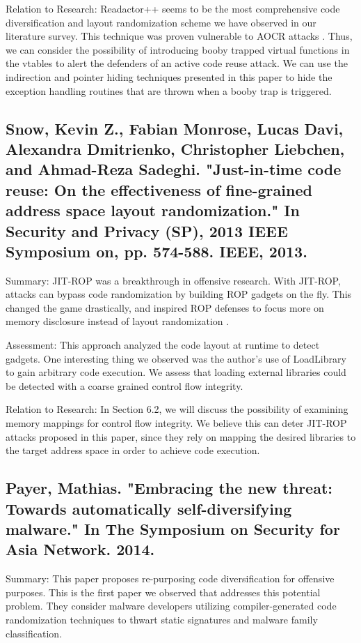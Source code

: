 \documentclass[preprint,12pt]{elsarticle}
\begin{document}
Relation to Research: Readactor++ seems to be the most comprehensive code diversification and layout randomization scheme we have observed in our literature survey. This technique was proven vulnerable to AOCR attacks \cite{rudd2017address}. Thus, we can consider the possibility of introducing booby trapped virtual functions in the vtables to alert the defenders of an active code reuse attack. We can use the indirection and pointer hiding techniques presented in this paper to hide the exception handling routines that are thrown when a booby trap is triggered.

\subsection{
\cite{snow2013just} Snow, Kevin Z., Fabian Monrose, Lucas Davi, Alexandra Dmitrienko, Christopher Liebchen, and Ahmad-Reza Sadeghi. "Just-in-time code reuse: On the effectiveness of fine-grained address space layout randomization." In Security and Privacy (SP), 2013 IEEE Symposium on, pp. 574-588. IEEE, 2013.
}

Summary: JIT-ROP was a breakthrough in offensive research. With JIT-ROP, attacks can bypass code randomization by building ROP gadgets on the fly. This changed the game drastically, and inspired ROP defenses to focus more on memory disclosure instead of layout randomization \cite{crane2015readactor} \cite{crane2015s}.

Assessment: This approach analyzed the code layout at runtime to detect gadgets. One interesting thing we observed was the author's use of LoadLibrary to gain arbitrary code execution. We assess that loading external libraries could be detected with a coarse grained control flow integrity. 

Relation to Research: In Section 6.2, we will discuss the possibility of examining memory mappings for control flow integrity. We believe this can deter JIT-ROP attacks proposed in this paper, since they rely on mapping the desired libraries to the target address space in order to achieve code execution.

\subsection{
\cite{payer2014embracing} Payer, Mathias. "Embracing the new threat: Towards automatically self-diversifying malware." In The Symposium on Security for Asia Network. 2014.
}

Summary: This paper proposes re-purposing code diversification for offensive purposes. This is the first paper we observed that addresses this potential problem. They consider malware developers utilizing compiler-generated code randomization techniques to thwart static signatures and malware family classification.
\end{document}
